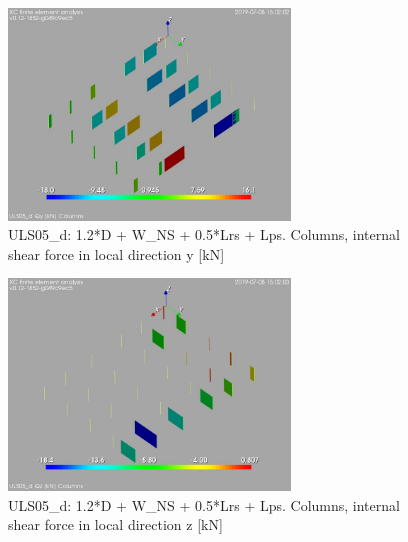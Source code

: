 \begin{figure}
\begin{center}
\includegraphics[width=75mm]{annex_res_columns/graphics/resSimplLC/ULS05_dcolumnsQy}
\caption{ULS05\_d: 1.2*D + W\_NS + 0.5*Lrs + Lps. Columns, internal shear force in local direction y [kN]}
\end{center}
\end{figure}
\begin{figure}
\begin{center}
\includegraphics[width=75mm]{annex_res_columns/graphics/resSimplLC/ULS05_dcolumnsQz}
\caption{ULS05\_d: 1.2*D + W\_NS + 0.5*Lrs + Lps. Columns, internal shear force in local direction z [kN]}
\end{center}
\end{figure}

